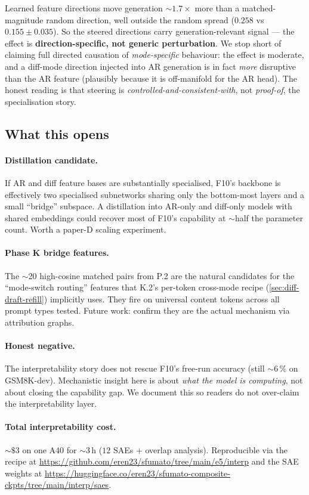 \noindent Learned feature directions move generation $\sim\!1.7\times$
more than a matched-magnitude random direction, well outside the
random spread ($0.258$ vs $0.155 \pm 0.035$). So the steered
directions carry generation-relevant signal --- the effect is
\textbf{direction-specific, not generic perturbation}. We stop short
of claiming full directed causation of \emph{mode-specific} behaviour:
the effect is moderate, and a diff-mode direction injected into AR
generation is in fact \emph{more} disruptive than the AR feature
(plausibly because it is off-manifold for the AR head). The honest
reading is that steering is \emph{controlled-and-consistent-with}, not
\emph{proof-of}, the specialisation story.

\subsection{What this opens}

\paragraph{Distillation candidate.} If AR and diff feature bases are
substantially specialised, F10's backbone is effectively two specialised
subnetworks sharing only the bottom-most layers and a small
``bridge'' subspace. A distillation into AR-only and diff-only
models with shared embeddings could recover most of F10's capability
at $\sim$half the parameter count. Worth a paper-D scaling experiment.

\paragraph{Phase K bridge features.} The $\sim$20 high-cosine matched
pairs from P.2 are the natural candidates for the ``mode-switch
routing'' features that K.2's per-token cross-mode recipe
(\textsection\ref{sec:diff-draft-refill}) implicitly uses. They fire
on universal content tokens across all prompt types tested. Future
work: confirm they are the actual mechanism via attribution graphs.

\paragraph{Honest negative.} The interpretability story does not
rescue F10's free-run accuracy (still $\sim$6\,\% on GSM8K-dev).
Mechanistic insight here is about \emph{what the model is computing},
not about closing the capability gap. We document this so readers
do not over-claim the interpretability layer.

\paragraph{Total interpretability cost.} $\sim\$3$ on one A40 for
$\sim$3\,h ($12$ SAEs $+$ overlap analysis). Reproducible via the
recipe at \url{https://github.com/eren23/sfumato/tree/main/e5/interp}
and the SAE weights at
\url{https://huggingface.co/eren23/sfumato-composite-ckpts/tree/main/interp/saes}.
